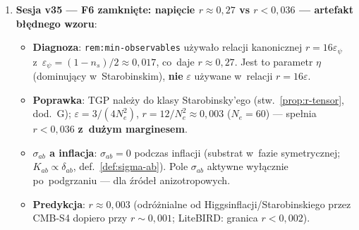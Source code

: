 \begin{remark}
\begin{enumerate}[nosep]
  \item \textbf{Sesja v35 --- F6 zamkni\k{e}te:
    napi\k{e}cie $r \approx 0{,}27$ vs $r < 0{,}036$ ---
    artefakt b\l{}\k{e}dnego wzoru}:
    \begin{itemize}[nosep]
      \item \textbf{Diagnoza}: \texttt{rem:min-observables}
        u\.zywa\l{}o relacji kanonicznej $r = 16\varepsilon_\psi$
        z~$\varepsilon_\psi = (1-n_s)/2 \approx 0{,}017$,
        co~daje $r \approx 0{,}27$.
        Jest to parametr $\eta$ (dominuj\k{a}cy w~Starobinskim),
        \textbf{nie} $\varepsilon$ u\.zywane w~relacji $r = 16\varepsilon$.
      \item \textbf{Poprawka}: TGP nale\.zy do klasy Starobinsky'ego
        (stw.~\ref{prop:r-tensor}, dod.~G);
        $\varepsilon = 3/(4N_e^2)$,
        $r = 12/N_e^2 \approx 0{,}003$ ($N_e=60$) ---
        spe\l{}nia $r < 0{,}036$ \textbf{z~du\.zym marginesem}.
      \item \textbf{$\sigma_{ab}$ a inflacja}: $\sigma_{ab} = 0$
        podczas inflacji (substrat w~fazie symetrycznej;
        $K_{ab} \propto \delta_{ab}$, def.~\ref{def:sigma-ab}).
        Pole $\sigma_{ab}$ aktywne wy\l{}\k{a}cznie
        po~podgrzaniu --- dla \'zr\'ode\l{} anizotropowych.
      \item \textbf{Predykcja}: $r \approx 0{,}003$
        (odr\'o\.znialne od Higgsinflacji/Starobinskiego
        przez CMB-S4 dopiero przy $r \sim 0{,}001$;
        LiteBIRD: granica $r < 0{,}002$).
    \end{itemize}


\end{enumerate}
\end{remark}
